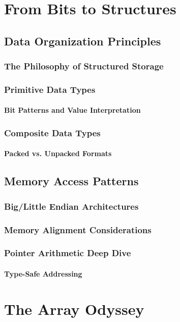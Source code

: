 \documentclass[12pt, oneside]{book}
\begin{document}
	
	\part{From Bits to Structures}
	\chapter{Data Organization Principles}
	\section{The Philosophy of Structured Storage}
	\section{Primitive Data Types}
	\subsection{Bit Patterns and Value Interpretation}
	\section{Composite Data Types}
	\subsection{Packed vs. Unpacked Formats}
	
	\chapter{Memory Access Patterns}
	\section{Big/Little Endian Architectures}
	\section{Memory Alignment Considerations}
	\section{Pointer Arithmetic Deep Dive}
	\subsection{Type-Safe Addressing}
	
	\part{The Array Odyssey}
\end{document}
